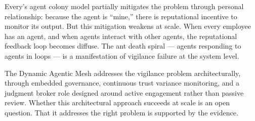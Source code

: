 Every's agent colony model partially mitigates the problem through personal relationship: because the agent is ``mine,'' there is reputational incentive to monitor its output. But this mitigation weakens at scale. When every employee has an agent, and when agents interact with other agents, the reputational feedback loop becomes diffuse. The ant death spiral --- agents responding to agents in loops --- is a manifestation of vigilance failure at the system level.

The Dynamic Agentic Mesh addresses the vigilance problem architecturally, through embedded governance, continuous trust variance monitoring, and a judgment broker role designed around active engagement rather than passive review. Whether this architectural approach succeeds at scale is an open question. That it addresses the right problem is supported by the evidence.
